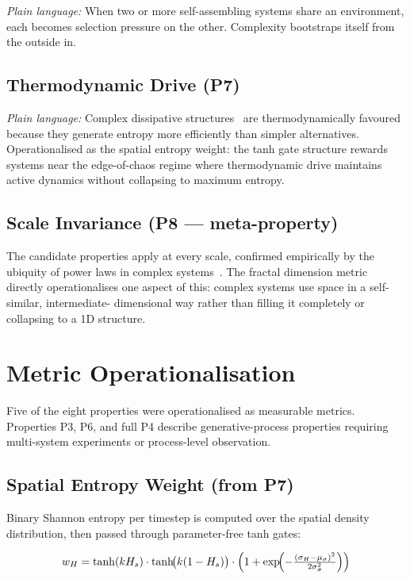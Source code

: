\documentclass[12pt,a4paper]{article}
\begin{document}
\textit{Plain language:} When two or more self-assembling systems share
an environment, each becomes selection pressure on the other.
Complexity bootstraps itself from the outside in.

\subsection{Thermodynamic Drive (P7)}

\textit{Plain language:} Complex dissipative structures~\cite{prigogine1977}
are thermodynamically favoured because they generate entropy more
efficiently than simpler alternatives.
Operationalised as the spatial entropy weight: the tanh gate structure
rewards systems near the edge-of-chaos regime where thermodynamic
drive maintains active dynamics without collapsing to maximum entropy.

\subsection{Scale Invariance (P8 --- meta-property)}

The candidate properties apply at every scale, confirmed empirically
by the ubiquity of power laws in complex systems~\cite{bak1987}.
The fractal dimension metric directly operationalises one aspect of
this: complex systems use space in a self-similar, intermediate-
dimensional way rather than filling it completely or collapsing to
a 1D structure.

\section{Metric Operationalisation}

Five of the eight properties were operationalised as measurable metrics.
Properties P3, P6, and full P4 describe generative-process properties
requiring multi-system experiments or process-level observation.

\subsection{Spatial Entropy Weight (from P7)}

Binary Shannon entropy per timestep is computed over the spatial
density distribution, then passed through parameter-free tanh gates:

\begin{equation}
w_H = \tanh(kH_s)\cdot\tanh\!\bigl(k(1-H_s)\bigr)
      \cdot\Bigl(1 + \exp\!\Bigl(-\tfrac{(\sigma_H-\mu_\sigma)^2}
      {2\sigma_\sigma^2}\Bigr)\Bigr)
\label{eq:wH}
\end{equation}
\end{document}
